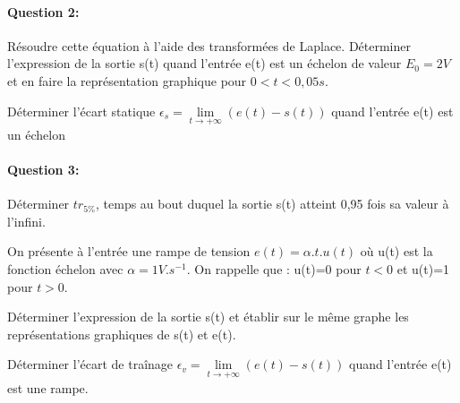 \paragraph{Question 2:}

Résoudre cette équation à l'aide des transformées de Laplace. Déterminer l'expression de la sortie s(t) quand l'entrée e(t) est un échelon de valeur $E_0=2V$ et en faire la représentation graphique pour $0<t<0,05s$.

Déterminer l'écart statique $\epsilon_s=\lim\limits_{t \to +\infty}(e(t)-s(t))$ quand l'entrée e(t) est un échelon

\paragraph{Question 3:}

Déterminer $tr_{5\%}$, temps au bout duquel la sortie s(t) atteint 0,95 fois sa valeur à l'infini.

On présente à l'entrée une rampe de tension $e(t)=\alpha.t.u(t)$ où u(t) est la fonction échelon avec $\alpha=1V.s^{-1}$. On rappelle que : u(t)=0 pour $t<0$ et u(t)=1 pour $t>0$.

Déterminer l'expression de la sortie s(t) et établir sur le même graphe les représentations graphiques de s(t) et e(t).

Déterminer l'écart de traînage $\epsilon_v=\lim\limits_{t \to +\infty}(e(t)-s(t))$ quand l'entrée e(t) est une rampe.

